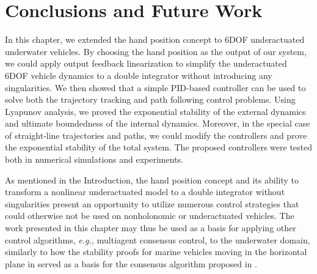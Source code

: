 \section{Conclusions and Future Work}
\label{sec:handpos_trajectory_conclusions}
In this chapter, we extended the hand position concept to 6DOF underactuated underwater vehicles.
By choosing the hand position as the output of our system, we could apply output feedback linearization to simplify the underactuated 6DOF vehicle dynamics to a double integrator without introducing any singularities. %
We then showed that a simple PID-based controller can be used to solve both the trajectory tracking and path following control problems.
Using Lyapunov analysis, we proved the exponential stability of the external dynamics and ultimate boundedness of the internal dynamics.
Moreover, in the special case of straight-line trajectories and paths, we could modify the controllers and prove the exponential stability of the total system.
The proposed controllers were tested both in numerical simulations and experiments.

As mentioned in the Introduction, the hand position concept and its ability to transform a nonlinear underactuated model to a double integrator without singularities present an opportunity to utilize numerous control strategies that could otherwise not be used on nonholonomic or underactuated vehicles.
The work presented in this chapter may thus be used as a basis for applying other control algorithms, \emph{e.g.,} multiagent consensus control, to the underwater domain, similarly to how the stability proofs for marine vehicles moving in the horizontal plane in \cite{paliotta_trajectory_2019} served as a basis for the consensus algorithm proposed in \cite{restrepo_tracking-formation_2022}.
